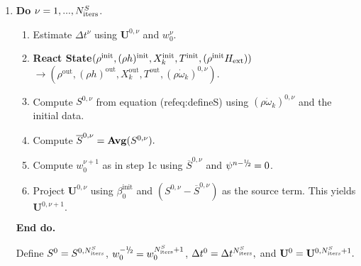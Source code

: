\documentclass[11pt]{article}
\newcommand{\sfrac}[2]{\mathchoice
  {\kern0em\raise.5ex\hbox{\the\scriptfont0 #1}\kern-.15em/
   \kern-.15em\lower.25ex\hbox{\the\scriptfont0 #2}}
  {\kern0em\raise.5ex\hbox{\the\scriptfont0 #1}\kern-.15em/
   \kern-.15em\lower.25ex\hbox{\the\scriptfont0 #2}}
  {\kern0em\raise.5ex\hbox{\the\scriptscriptfont0 #1}\kern-.2em/
   \kern-.15em\lower.25ex\hbox{\the\scriptscriptfont0 #2}}
  {#1\!/#2}}
\newcommand{\myhalf}{\sfrac{1}{2}}
\newcommand{\nmh}{{n - \myhalf}}
\newcommand{\Hext}{{H_{\rm ext}}}
\newcommand{\initp}{\mathrm{init}}
\newcommand{\outp}{\mathrm{out}}
\newcommand{\dt}{\Delta t}
\newcommand{\ubold}{\mathbf{U}}
\newcommand{\omegadot}{\dot{\omega}}
\begin{document}
\begin{enumerate}
\renewcommand{\theenumi}{{\bf \alph{enumi}}}
\renewcommand{\labelenumii}{\roman{enumii}.}

\item {\bf Do} {$\nu = 1,...,N_{\rm iters}^{S}$.}
  \begin{enumerate}

  \item Estimate $\Delta t^\nu$ using $\ubold^{0,\nu}$ and $w_0^\nu.$

  \item {\bf React State}$( \rho^{\initp},(\rho h)^{\initp}, X_k^{\initp}, T^{\initp}, (\rho^{\initp} \Hext) )$\\
      $\rightarrow (\rho^{\outp}, (\rho h)^{\outp}, X_k^{\outp}, T^{\outp}, (\rho \omegadot_k)^{0,\nu} ).$

  \item Compute $S^{0,\nu}$ from equation (ref{eq:defineS}) 
        using $(\rho \omegadot_k)^{0,\nu}$ and the initial data.

  \item Compute $\overline{S}^{0,\nu} = {\mathrm{\bf Avg}} (S^{0,\nu}).$

  \item Compute $w_0^{\nu+1}$ as in step 1c using $\overline{S}^{0,\nu}$ and $\psi^{\nmh} = 0$.
        

  \item Project $\ubold^{0,\nu}$ using $\beta_0^{\initp}$ and 
        $(S^{0,\nu} - \overline{S}^{0,\nu})$ as the source term.  
        This yields $\ubold^{0,\nu+1}.$

  \end{enumerate}

  {\bf End do.}

  Define $S^0 = S^{0,N_{\rm iters}^S}$, $w_0^{-\myhalf} = w_0^{N_{\rm iters}^S+1}$, 
$\dt^0 = \Delta t^{N_{\rm iters}^S},$ and $\ubold^0 = \ubold^{0,N_{\rm iters}^S+1}.$

\end{enumerate}
\end{document}
